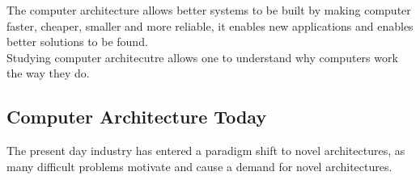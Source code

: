 \documentclass[11pt,a4paper,twocolumn]{book}
\begin{document}
The computer architecture allows better systems to be built by making computer faster, cheaper, smaller and more reliable, it enables new applications and enables better solutions to be found.\\

Studying computer architecutre allows one to understand why computers work the way they do.

\subsection{Computer Architecture Today}

The present day industry has entered a paradigm shift to novel architectures, as many difficult problems motivate and cause a demand for novel architectures.
\end{document}
